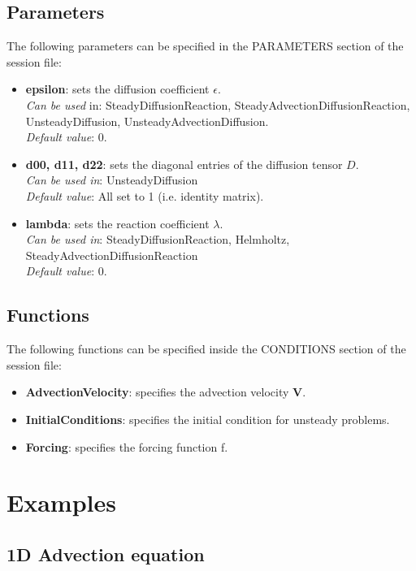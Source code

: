 \subsection{Parameters}

The following parameters can be specified in the PARAMETERS section of the session file:
\begin{itemize}
\item \textbf{epsilon}: sets the diffusion coefficient $\epsilon$.\\ 
\textit{Can be used} in: SteadyDiffusionReaction, SteadyAdvectionDiffusionReaction, UnsteadyDiffusion, UnsteadyAdvectionDiffusion. \\
\textit{Default value}: 0.
\item  \textbf{d00, d11, d22}: sets the diagonal entries of the diffusion tensor $D$. \\
\textit{Can be used in}: UnsteadyDiffusion \\
\textit{Default value}: All set to 1 (i.e. identity matrix). 
\item  \textbf{lambda}: sets the reaction coefficient  $\lambda$. \\
\textit{Can be used in}: SteadyDiffusionReaction, Helmholtz, SteadyAdvectionDiffusionReaction\\
\textit{Default value}: 0.
\end{itemize}

\subsection{Functions}

The following functions can be specified inside the CONDITIONS section of the session file:

\begin{itemize}
\item \textbf{AdvectionVelocity}: specifies the advection velocity $\mathbf{V}$.
\item \textbf{InitialConditions}: specifies the initial condition for unsteady problems.
\item \textbf{Forcing}: specifies the forcing function f.
\end{itemize}

\section{Examples}

\subsection{1D Advection equation}

